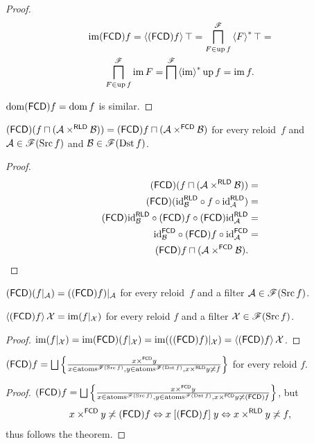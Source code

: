 \begin{proof}
~
\begin{multline*}
\operatorname{im}(\mathsf{FCD}) f=\left\langle (\mathsf{FCD}) f\right\rangle\top=\bigsqcap_{F\in\operatorname{up} f}^{\mathscr{F}}\left\langle F\right\rangle ^{\ast}\top=\\
\bigsqcap_{F\in\operatorname{up} f}^{\mathscr{F}}\operatorname{im} F=\bigsqcap^{\mathscr{F}}\left\langle \operatorname{im}\right\rangle ^{\ast}\operatorname{up} f=\operatorname{im} f.
\end{multline*}


$\operatorname{dom}(\mathsf{FCD}) f=\operatorname{dom} f$ is similar.\end{proof}
\begin{prop}\label{fcd-meet-prod-rld}
$(\mathsf{FCD})(f\sqcap(\mathcal{A}\times^{\mathsf{RLD}}\mathcal{B}))=(\mathsf{FCD}) f\sqcap(\mathcal{A}\times^{\mathsf{FCD}}\mathcal{B})$
for every reloid~$f$ and $\mathcal{A}\in\mathscr{F}(\operatorname{Src} f)$ and
$\mathcal{B}\in\mathscr{F}(\operatorname{Dst} f)$.\end{prop}
\begin{proof}
~
\begin{align*}
(\mathsf{FCD})(f\sqcap(\mathcal{A}\times^{\mathsf{RLD}}\mathcal{B})) & =\\
(\mathsf{FCD})({\operatorname{id}}_{\mathcal{B}}^{\mathsf{RLD}}\circ f\circ{\operatorname{id}}_{\mathcal{A}}^{\mathsf{RLD}}) & =\\
(\mathsf{FCD}){\operatorname{id}}_{\mathcal{B}}^{\mathsf{RLD}}\circ(\mathsf{FCD}) f\circ(\mathsf{FCD}){\operatorname{id}}_{\mathcal{A}}^{\mathsf{RLD}} & =\\
{\operatorname{id}}_{\mathcal{B}}^{\mathsf{FCD}}\circ(\mathsf{FCD}) f\circ{\operatorname{id}}_{\mathcal{A}}^{\mathsf{FCD}} & =\\
(\mathsf{FCD}) f\sqcap(\mathcal{A}\times^{\mathsf{FCD}}\mathcal{B}).
\end{align*}
\end{proof}
\begin{cor}
$(\mathsf{FCD})(f|_{\mathcal{A}})=((\mathsf{FCD}) f)|_{\mathcal{A}}$ for every reloid~$f$
and a filter $\mathcal{A}\in\mathscr{F}(\operatorname{Src} f)$.\end{cor}
\begin{prop}
$\left\langle (\mathsf{FCD}) f\right\rangle\mathcal{X}=\operatorname{im}(f|_{\mathcal{X}})$ for every reloid
$f$ and a filter $\mathcal{X}\in\mathscr{F}(\operatorname{Src} f)$.\end{prop}
\begin{proof}
$\operatorname{im}(f|_{\mathcal{X}})=\operatorname{im}(\mathsf{FCD})(f|_{\mathcal{X}})=\operatorname{im}(((\mathsf{FCD}) f)|_{\mathcal{X}})=\left\langle (\mathsf{FCD}) f\right\rangle\mathcal{X}$.\end{proof}
\begin{prop}
$\tofcd f=\bigsqcup\setcond{x\times^{\mathsf{FCD}}y}{x\in\atoms^{\mathscr{F}(\Src f)},y\in\atoms^{\mathscr{F}(\Dst f)},x\times^{\mathsf{RLD}}y\nasymp f}$
for every reloid $f$.\end{prop}
\begin{proof}
$\tofcd f=\bigsqcup\setcond{x\times^{\mathsf{FCD}}y}{x\in\atoms^{\mathscr{F}(\Src f)},y\in\atoms^{\mathscr{F}(\Dst f)},x\times^{\mathsf{FCD}}y\nasymp\tofcd f}$,
but \[x\times^{\mathsf{FCD}}y\not\asymp(\mathsf{FCD}) f\Leftrightarrow x\mathrel{\left[(\mathsf{FCD}) f\right]}y\Leftrightarrow x\times^{\mathsf{RLD}}y\not\asymp f,\]
thus follows the theorem.
\end{proof}


